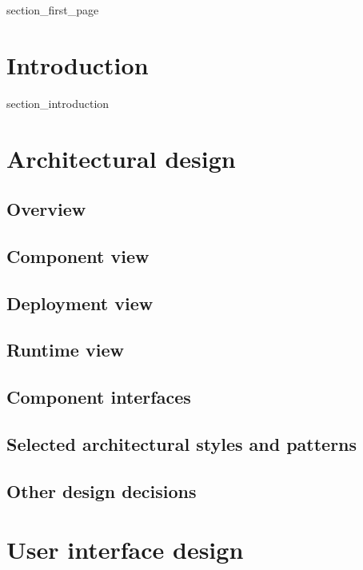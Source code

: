 \documentclass[a4paper]{article}
\begin{document}
{section_first_page}

\newpage
{}

\tableofcontents

\newpage
{}

\section{Introduction}\label{introduction}

{section_introduction}

\newpage

\section{Architectural design}\label{architectural_design}

\subsection{Overview}
\subsection{Component view}
\subsection{Deployment view}
\subsection{Runtime view}
\subsection{Component interfaces}
\subsection{Selected architectural styles and patterns}
\subsection{Other design decisions}

\newpage

\section{User interface design}\label{user_interface_design}
\end{document}
